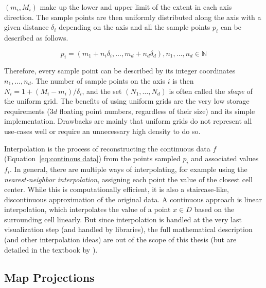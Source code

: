 $(m_i, M_i)$  make up the lower and upper limit of the extent in each axis direction. 
The sample points are then uniformly distributed along the axis with a given distance $\delta_i$ depending on the axis and all the sample points $p_i$ can be described as follows. 

\begin{equation}
  p_i = (m_1 + n_i\delta_i,\dots, m_d + n_d\delta_d), n_1, \dots, n_d \in \mathbb{N}
  \label{eq:smaple point uniform grid}
\end{equation}

Therefore, every sample point can be described by its integer coordinates $n_1, \dots, n_d$. 
The number of sample points on the axis $i$ is then $N_i = 1 + (M_i - m_i)/\delta_i$, and the set $(N_1, \dots, N_d)$ is often called the \textit{shape} of the uniform grid.   
The benefits of using uniform grids are the very low storage requirements ($3d$ floating point numbers, regardless of their size) and its simple implementation. 
Drawbacks are mainly that uniform grids do not represent all use-cases well or require an unnecessary high density to do so. 


Interpolation is the process of reconstructing the continuous data $f$ (Equation~\ref{eq:continous data}) from the points sampled $p_i$ and associated values $f_i$. 
In general, there are multiple ways of interpolating, for example using the \textit{ nearest-neighbor interpolation}, assigning each point the value of the closest cell center. 
While this is computationally efficient, it is also a staircase-like, discontinuous approximation of the original data. 
A continuous approach is linear interpolation, which interpolates the value of a point $x \in D$ based on the surrounding cell linearly. 
But since interpolation is handled at the very last visualization step (and handled by libraries), the full mathematical description (and other interpolation ideas) are out of the scope of this thesis (but are detailed in the textbook by \citeauthor{telea2014data}). \cite{telea2014data} 

\subsection{Map Projections}
\label{sec:map projections}

